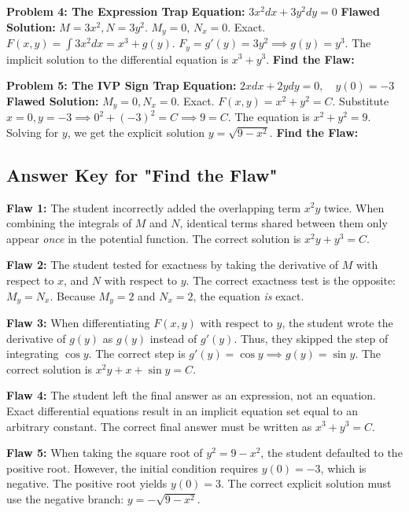 \documentclass[11pt]{article}
\begin{document}
\noindent \textbf{Problem 4: The Expression Trap}
\newline \textbf{Equation:} $3x^2 dx + 3y^2 dy = 0$
\newline \textbf{Flawed Solution:} 
$M = 3x^2, N = 3y^2$. $M_y = 0$, $N_x = 0$. Exact.
$F(x,y) = \int 3x^2 dx = x^3 + g(y)$.
$F_y = g'(y) = 3y^2 \implies g(y) = y^3$.
The implicit solution to the differential equation is $x^3 + y^3$.
\newline \textbf{Find the Flaw:}
\vspace{1cm}

\noindent \textbf{Problem 5: The IVP Sign Trap}
\newline \textbf{Equation:} $2x dx + 2y dy = 0, \quad y(0) = -3$
\newline \textbf{Flawed Solution:} 
$M_y = 0, N_x = 0$. Exact.
$F(x,y) = x^2 + y^2 = C$.
Substitute $x=0, y=-3 \implies 0^2 + (-3)^2 = C \implies 9 = C$.
The equation is $x^2 + y^2 = 9$.
Solving for $y$, we get the explicit solution $y = \sqrt{9 - x^2}$.
\newline \textbf{Find the Flaw:}
\vspace{1cm}

\newpage
\subsection*{Answer Key for "Find the Flaw"}
\textbf{Flaw 1:} The student incorrectly added the overlapping term $x^2 y$ twice. When combining the integrals of $M$ and $N$, identical terms shared between them only appear \textit{once} in the potential function. The correct solution is $x^2 y + y^3 = C$.

\textbf{Flaw 2:} The student tested for exactness by taking the derivative of $M$ with respect to $x$, and $N$ with respect to $y$. The correct exactness test is the opposite: $M_y = N_x$. Because $M_y = 2$ and $N_x = 2$, the equation \textit{is} exact.

\textbf{Flaw 3:} When differentiating $F(x,y)$ with respect to $y$, the student wrote the derivative of $g(y)$ as $g(y)$ instead of $g'(y)$. Thus, they skipped the step of integrating $\cos y$. The correct step is $g'(y) = \cos y \implies g(y) = \sin y$. The correct solution is $x^2 y + x + \sin y = C$.

\textbf{Flaw 4:} The student left the final answer as an expression, not an equation. Exact differential equations result in an implicit equation set equal to an arbitrary constant. The correct final answer must be written as $x^3 + y^3 = C$.

\textbf{Flaw 5:} When taking the square root of $y^2 = 9 - x^2$, the student defaulted to the positive root. However, the initial condition requires $y(0) = -3$, which is negative. The positive root yields $y(0) = 3$. The correct explicit solution must use the negative branch: $y = -\sqrt{9 - x^2}$.
\end{document}

